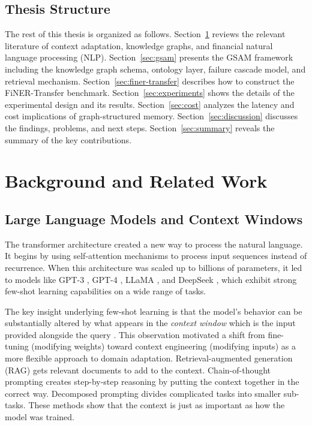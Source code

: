 \documentclass[12pt,a4paper,oneside]{article}
\begin{document}
\subsection{Thesis Structure}

The rest of this thesis is organized as follows. Section~\ref{sec:background} reviews the relevant literature of context adaptation, knowledge graphs, and financial natural language processing (NLP). Section~\ref{sec:gsam} presents the GSAM framework including the knowledge graph schema, ontology layer, failure cascade model, and retrieval mechanism. Section~\ref{sec:finer-transfer} describes how to construct the FiNER-Transfer benchmark. Section~\ref{sec:experiments} shows the details of the experimental design and its results. Section~\ref{sec:cost} analyzes the latency and cost implications of graph-structured memory. Section~\ref{sec:discussion} discusses the findings, problems, and next steps. Section~\ref{sec:summary} reveals the summary of the key contributions.


\section{Background and Related Work}
\label{sec:background}

\subsection{Large Language Models and Context Windows}

The transformer architecture \citep{vaswani2017attention} created a new way to process the natural language. It begins by using self-attention mechanisms to process input sequences instead of recurrence. When this architecture was scaled up to billions of parameters, it led to models like GPT-3 \citep{brown2020language}, GPT-4 \citep{openai2023gpt4}, LLaMA \citep{touvron2023llama}, and DeepSeek \citep{deepseek2024}, which exhibit strong few-shot learning capabilities on a wide range of tasks.

The key insight underlying few-shot learning is that the model's behavior can be substantially altered by what appears in the \textit{context window} which is the input provided alongside the query \citep{brown2020language}. This observation motivated a shift from fine-tuning (modifying weights) toward context engineering (modifying inputs) as a more flexible approach to domain adaptation. Retrieval-augmented generation (RAG) \citep{lewis2020retrieval} gets relevant documents to add to the context. Chain-of-thought prompting \citep{wei2022chain} creates step-by-step reasoning by putting the context together in the correct way. Decomposed prompting \citep{khot2022decomposed} divides complicated tasks into smaller sub-tasks. These methods show that the context is just as important as how the model was trained.
\end{document}
